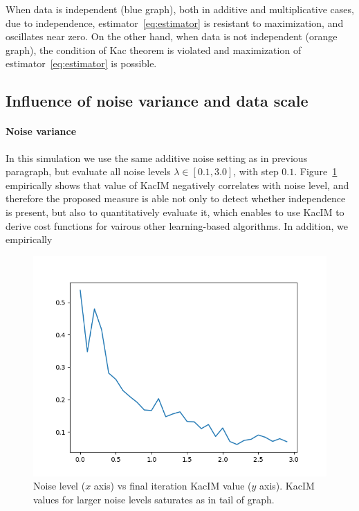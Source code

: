 \documentclass{article}
\begin{document}
When data is independent (blue graph), both in additive and multiplicative cases, due to independence, estimator~\eqref{eq:estimator} is resistant to maximization, and oscillates near zero. On the other hand, when data is not independent (orange graph), the condition of Kac theorem is violated and maximization of estimator~\eqref{eq:estimator} is possible.

\subsection{Influence of noise variance and data scale}
\paragraph{Noise variance} In this simulation we use the same additive noise setting as in previous paragraph, but evaluate all noise levels $\lambda \in [0.1, 3.0]$, with step $0.1$.
Figure~\ref{fig:experiments_noise_level_effect} empirically shows that value of KacIM  negatively correlates with noise level, and therefore the proposed measure is able not only to detect whether independence is present, but also to quantitatively evaluate it, which enables to use KacIM to derive cost functions for vairous other learning-based algorithms. 
In addition, we empirically


\begin{figure}[t]
\label{fig:experiments_noise_level_effect}
\centering
\includegraphics[scale=0.50]{./summary_noise_effect.png}
\caption{Noise level ($x$ axis) vs final iteration KacIM value ($y$ axis). KacIM values for larger noise levels saturates as in tail of graph.}
\end{figure}
\end{document}
